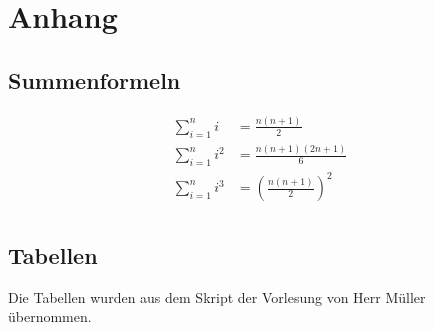 \section{Anhang}
\subsection{Summenformeln}
\[ \begin{aligned}
  \sum_{i=1}^{n}i     & = \frac{n(n+1)}{2} \\
  \sum_{i=1}^{n}i^2   & = \frac{n(n+1)(2n+1)}{6} \\
  \sum_{i=1}^{n}i^3   & = \left(\frac{n(n+1)}{2}\right)^2 \\
\end{aligned} \]

\subsection{Tabellen}
Die Tabellen wurden aus dem Skript der Vorlesung von Herr Müller
übernommen.

